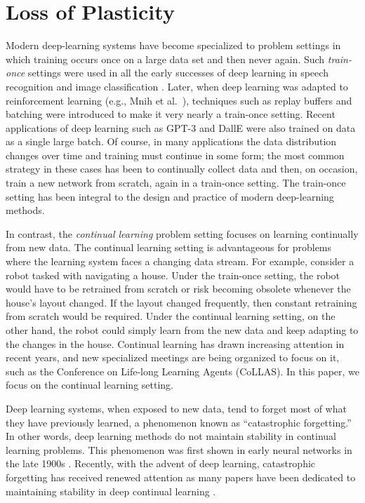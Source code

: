\documentclass[review, number,3p]{elsarticle}
\begin{document}
\section{Loss of Plasticity}

Modern deep-learning systems have become specialized to problem settings in which training occurs once on a large data set and then never again.
Such \textit{train-once} settings were used in all the early successes of deep learning in speech recognition \cite{hinton2012speech} and image classification \cite{krishevsky2012}. 
Later, when deep learning was adapted to reinforcement learning (e.g., Mnih et al.\ \cite{mnih2015human}), techniques such as replay buffers and batching were introduced to make it very nearly a train-once setting.
Recent applications of deep learning such as GPT-3 \cite{brown2020} and DallE \cite{dallE} were also trained on data as a single large batch.
Of course, in many applications the data distribution changes over time and training must continue in some form;
the most common strategy in these cases has been to continually collect data and then, on occasion, train a new network from scratch, again in a train-once setting.
The train-once setting has been integral to the design and practice of modern deep-learning methods.

In contrast, the \textit{continual learning} problem setting focuses on learning continually from new data.
The continual learning setting is advantageous for problems where the learning system faces a changing data stream.
For example, consider a robot tasked with navigating a house.
Under the train-once setting, the robot would have to be retrained from scratch or risk becoming obsolete whenever the house's layout changed.
If the layout changed frequently, then constant retraining from scratch would be required.
Under the continual learning setting, on the other hand, the robot could simply learn from the new data and keep adapting to the changes in the house.
Continual learning has drawn increasing attention in recent years, and new specialized meetings are being organized to focus on it, such as the Conference on Life-long Learning Agents (CoLLAS). 
In this paper, we focus on the continual learning setting.


Deep learning systems, when exposed to new data, tend to forget most of what they have previously learned, a phenomenon known as ``catastrophic forgetting.''
In other words, deep learning methods do not maintain stability in continual learning problems.
This phenomenon was first shown in early neural networks in the late 1900s \cite{mccloskey1989, french1999}.
Recently, with the advent of deep learning, catastrophic forgetting has received renewed attention as many papers have been dedicated to maintaining stability in deep continual learning \cite{kirkpatrick2017, yoon2018, aljundi2019, golkar2019, riemer2019, rajasegaran2019, javed2019, aspects-of-cl}.
\end{document}
